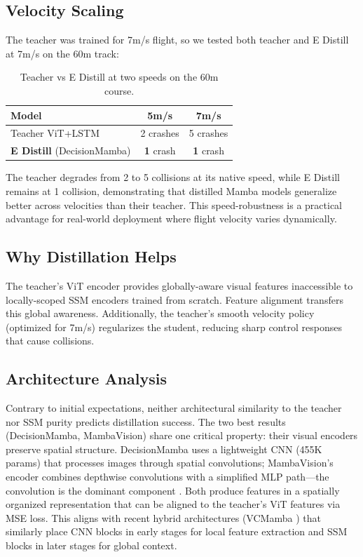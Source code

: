 \documentclass{article}
\begin{document}
\subsection{Velocity Scaling}
\label{sec:velocity}

The teacher was trained for 7m/s flight, so we tested both teacher and E Distill at 7m/s on the 60m track:

\begin{table}[t]
\centering
\caption{Teacher vs E Distill at two speeds on the 60m course.}
\label{tab:velocity}
\begin{tabular}{lcc}
\toprule
Model & 5m/s & 7m/s \\
\midrule
Teacher ViT+LSTM & 2 crashes & 5 crashes \\
\textbf{E Distill} (DecisionMamba) & \textbf{1} crash & \textbf{1} crash \\
\bottomrule
\end{tabular}
\end{table}

The teacher degrades from 2 to 5 collisions at its native speed, while E Distill remains at 1 collision, demonstrating that distilled Mamba models generalize better across velocities than their teacher. This speed-robustness is a practical advantage for real-world deployment where flight velocity varies dynamically.

\subsection{Why Distillation Helps}
The teacher's ViT encoder provides globally-aware visual features inaccessible to locally-scoped SSM encoders trained from scratch. Feature alignment transfers this global awareness. Additionally, the teacher's smooth velocity policy (optimized for 7m/s) regularizes the student, reducing sharp control responses that cause collisions.

\subsection{Architecture Analysis}
Contrary to initial expectations, neither architectural similarity to the teacher nor SSM purity predicts distillation success. The two best results (DecisionMamba, MambaVision) share one critical property: their visual encoders preserve spatial structure. DecisionMamba uses a lightweight CNN (455K params) that processes images through spatial convolutions; MambaVision's encoder combines depthwise convolutions with a simplified MLP path---the convolution is the dominant component \cite{hatamizadeh2024mambavision}. Both produce features in a spatially organized representation that can be aligned to the teacher's ViT features via MSE loss. This aligns with recent hybrid architectures (VCMamba \cite{vcmamba2025}) that similarly place CNN blocks in early stages for local feature extraction and SSM blocks in later stages for global context.
\end{document}
